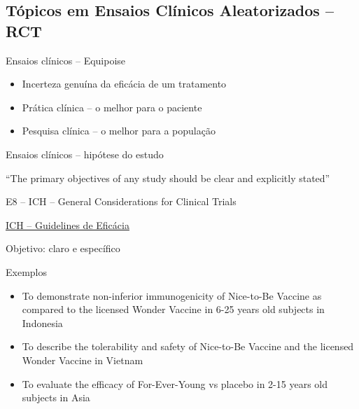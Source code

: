 \documentclass{beamer}
\begin{document}

\subsection[RCT]{Tópicos em Ensaios Clínicos Aleatorizados -- RCT}

\begin{frame}{Ensaios clínicos -- Equipoise}
  \begin{itemize}
    \small
  \item Incerteza genuína da eficácia de um tratamento
    \bigskip
  \item Prática clínica -- o melhor para o paciente
    \bigskip
  \item Pesquisa clínica -- o melhor para a população
  \end{itemize}
\end{frame}

\begin{frame}{Ensaios clínicos -- hipótese do estudo}

  \begin{block}{}
    ``The primary objectives of any study should be clear and explicitly stated''

    \bigskip
    \vfill
    \scriptsize
    \hfill E8 -- ICH -- General Considerations for Clinical Trials
  \end{block}
  \vfill
  \tiny
  \begin{center}
    \href{https://www.ich.org/products/guidelines/efficacy/article/efficacy-guidelines.html}{ICH -- Guidelines de Eficácia}
  \end{center}
\end{frame}

\begin{frame}{Objetivo: claro e específico}
  \begin{exampleblock}{Exemplos}
    \begin{itemize}
      \scriptsize
    \item To demonstrate non-inferior immunogenicity of Nice-to-Be Vaccine as compared to the licensed Wonder Vaccine in 6-25 years old subjects in Indonesia
      \bigskip
    \item To describe the tolerability and safety of Nice-to-Be Vaccine and the licensed Wonder Vaccine in Vietnam
      \bigskip
    \item To evaluate the efficacy of For-Ever-Young vs placebo in 2-15 years old subjects in Asia
    \end{itemize}
  \end{exampleblock}
\end{frame}
\end{document}
